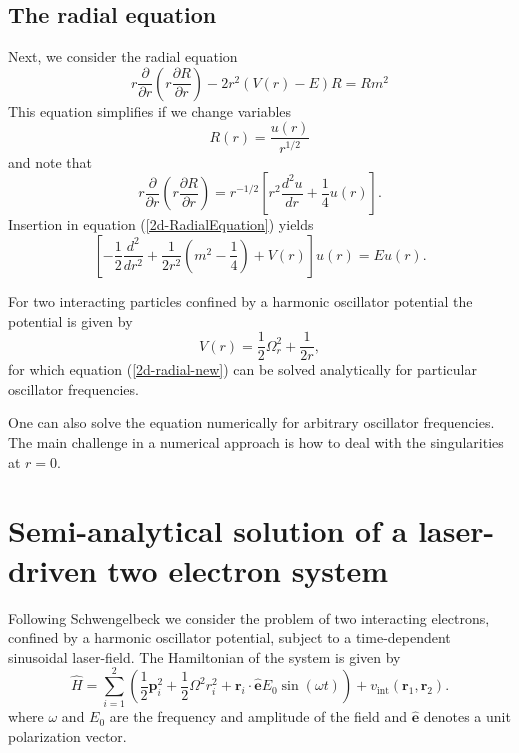 \documentclass[aip,jcp,reprint,floatfix]{revtex4-1}
\begin{document}
\begin{appendices}
\subsection{The radial equation}
Next, we consider the radial equation
\begin{equation}
    r\frac{\partial}{\partial r} \left( r \frac{\partial R}{\partial r} \right) -2r^2 (V(r)-E)R = Rm^2 \label{2d-RadialEquation}
    \end{equation}
This equation simplifies if we change variables
\begin{equation}
    R(r) = \frac{u(r)}{r^{1/2}}
\end{equation}
and note that 
\begin{equation}
    r\frac{\partial}{\partial r} \left( r \frac{\partial R}{\partial r} \right) = r^{-1/2} \left[ r^2 \frac{d^2 u}{dr} + \frac{1}{4}u(r) \right].
\end{equation}
Insertion in equation (\ref{2d-RadialEquation}) yields
\begin{equation}
    \left[ -\frac{1}{2} \frac{d^2}{dr^2} + \frac{1}{2r^2} \left( m^2 - \frac{1}{4} \right) + V(r) \right] u(r) = Eu(r) \label{2d-radial-new}.
\end{equation}

For two interacting particles confined by a harmonic oscillator potential the potential is given by 
\begin{equation}
    V(r) = \frac{1}{2}\Omega_r^2 + \frac{1}{2r},
\end{equation}
for which equation (\ref{2d-radial-new}) can be solved analytically for particular oscillator frequencies\cite{Taut94}. 

One can also solve the equation numerically for arbitrary oscillator frequencies. The main challenge in a numerical approach is how to deal with the singularities at $r=0$.

\section{Semi-analytical solution of a laser-driven two electron system}
Following Schwengelbeck \cite{SCHWENGELBECK_1999} we consider the problem of two interacting electrons, confined by a harmonic oscillator potential, subject to a time-dependent sinusoidal laser-field. The Hamiltonian of the system is given by 
\begin{equation}
    \hat{H} = \sum_{i=1}^2 \left(\frac{1}{2} \mathbf{p}_i^2 + \frac{1}{2} \Omega^2 r_i^2 + \mathbf{r}_i \cdot \hat{\mathbf{e}} E_0 \sin(\omega t)  \right) + v_{\text{int}}(\mathbf{r}_1,\mathbf{r}_2). 
\end{equation}
where $\omega$ and $E_0$ are the frequency and amplitude of the field and $\hat{\mathbf{e}}$ denotes a unit polarization vector.


\end{appendices}
\end{document}
